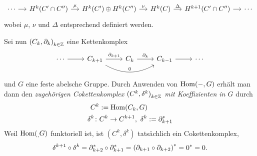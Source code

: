 \begin{kommentar}
\begin{enumerate}
\begin{enumerate}
          \begin{equation*}
            \begin{tikzcd}[column sep=small]
              \dotsb \arrow{r}{}  & H^k(C' \cap C'') \arrow{r}{\mu}  & H^k(C') \oplus H^k(C'') \arrow{r}{\nu} & H^k(C) \arrow{r}{\Delta}  & H^{k+1}(C' \cap C'') \arrow{r}{} & \dotsb
            \end{tikzcd}
          \end{equation*}
          wobei $\mu$, $\nu$ und $\Delta$ entsprechend definiert werden.
      \end{enumerate}
  \end{enumerate}
\end{kommentar}
\begin{beispiel}[wichtig]
  Sei nun ${( C_k, \partial_k )}_{k \in \mathbb{Z}}$ eine Kettenkomplex
  \begin{equation*}
    \begin{tikzcd}
      \dotsb \arrow{r}{}  & C_{k+1} \arrow[bend right]{rr}{0}
                            \arrow{r}{\del_{k+1}}     & C_{k} \arrow{r}{\del_k} & C_{k-1} \arrow{r}{} & \dotsb
    \end{tikzcd}
  \end{equation*}
  und $G$ eine feste abelsche Gruppe.
  Durch Anwenden von $\mathrm{Hom}(-,G)$ erhält man dann den \emph{zugehörigen Cokettenkomplex ${(C^k,\delta^k)}_{k \in \mathbb{Z}}$ mit Koeffizienten in $G$} durch
  \begin{align*}
    C^k & := \mathrm{Hom}(C_k,G) \\
    \delta^k \colon & C^k \to C^{k+1}, \ \delta^k := \partial_{k+1}^*
  \end{align*}
  Weil $\mathrm{Hom}(_,G)$ funktoriell ist, ist $(C^k,\delta^k)$ tatsächlich ein Cokettenkomplex,
  \begin{equation*}
    \delta^{k+1} \circ \delta^k = \partial_{k+2}^* \circ \partial_{k+1}^* = {(\partial_{k+1} \circ \partial_{k+2})}^* = 0^* = 0.
  \end{equation*}
\end{beispiel}

